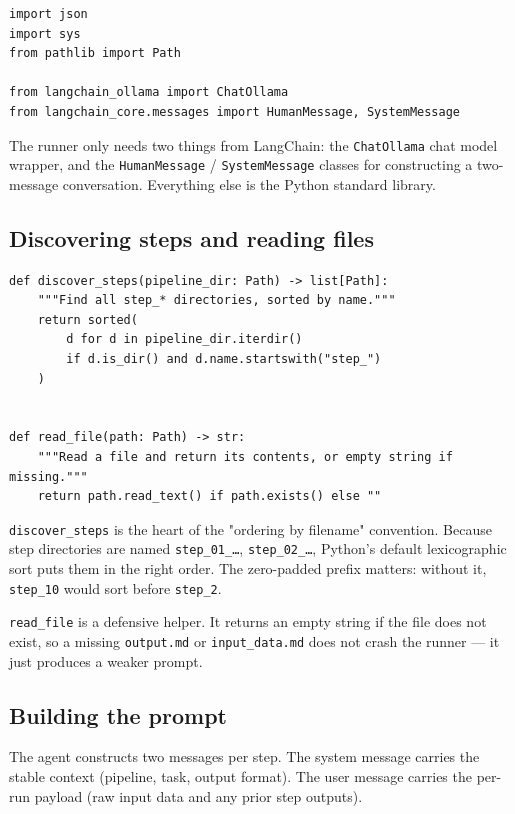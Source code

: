 \documentclass[12pt, a4paper]{article}
\begin{document}
\begin{lstlisting}[style=pythonstyle]
import json
import sys
from pathlib import Path

from langchain_ollama import ChatOllama
from langchain_core.messages import HumanMessage, SystemMessage
\end{lstlisting}

The runner only needs two things from LangChain: the \texttt{ChatOllama} chat model wrapper, and the \texttt{HumanMessage} / \texttt{SystemMessage} classes for constructing a two-message conversation. Everything else is the Python standard library.

\subsection{Discovering steps and reading files}

\begin{lstlisting}[style=pythonstyle]
def discover_steps(pipeline_dir: Path) -> list[Path]:
    """Find all step_* directories, sorted by name."""
    return sorted(
        d for d in pipeline_dir.iterdir()
        if d.is_dir() and d.name.startswith("step_")
    )


def read_file(path: Path) -> str:
    """Read a file and return its contents, or empty string if missing."""
    return path.read_text() if path.exists() else ""
\end{lstlisting}

\texttt{discover\_steps} is the heart of the "ordering by filename" convention. Because step directories are named \texttt{step\_01\_\ldots}, \texttt{step\_02\_\ldots}, Python's default lexicographic sort puts them in the right order. The zero-padded prefix matters: without it, \texttt{step\_10} would sort before \texttt{step\_2}.

\texttt{read\_file} is a defensive helper. It returns an empty string if the file does not exist, so a missing \texttt{output.md} or \texttt{input\_data.md} does not crash the runner — it just produces a weaker prompt.

\subsection{Building the prompt}

The agent constructs two messages per step. The system message carries the stable context (pipeline, task, output format). The user message carries the per-run payload (raw input data and any prior step outputs).
\end{document}

